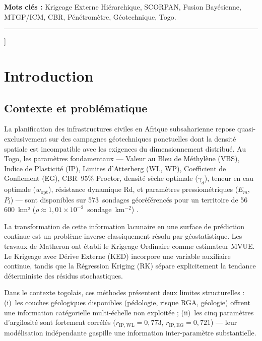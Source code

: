 \documentclass[10pt,a4paper,twocolumn]{article}
\begin{document}
  \smallskip
  \noindent\small
  \textbf{Mots clés :} Krigeage Externe Hiérarchique, SCORPAN, Fusion Bayésienne,
    MTGP/ICM, CBR, Pénétromètre, Géotechnique, Togo.

  \vspace{0.15cm}
  \rule{\linewidth}{0.4pt}
  \vspace{0.3cm}
]

\section{Introduction}

\subsection{Contexte et problématique}

La planification des infrastructures civiles en Afrique subsaharienne repose
quasi-exclusivement sur des campagnes géotechniques ponctuelles dont la densité
spatiale est incompatible avec les exigences du dimensionnement distribué.
Au Togo, les paramètres fondamentaux --- Valeur au Bleu de Méthylène (VBS),
Indice de Plasticité (IP), Limites d'Atterberg (WL, WP), Coefficient de Gonflement
(EG), CBR~95\% Proctor, densité sèche optimale ($\gamma_d$), teneur en eau
optimale ($w_{\mathrm{opt}}$), résistance dynamique Rd, et paramètres
pressiométriques ($E_m$, $P_l$) --- sont disponibles sur 573~sondages
géoréférencés pour un territoire de 56\,600~km²
($\rho \approx 1{,}01 \times 10^{-2}$~sondage~km$^{-2}$)
\cite{mcbratney2003digital}.

La transformation de cette information lacunaire en une surface de prédiction
continue est un problème inverse classiquement résolu par géostatistique.
Les travaux de Matheron \cite{matheron1963} ont établi le Krigeage Ordinaire
comme estimateur MVUE. Le Krigeage avec Dérive Externe (KED) \cite{odeh1994further}
incorpore une variable auxiliaire continue, tandis que la Régression Kriging (RK)
\cite{hengl2007regression} sépare explicitement la tendance déterministe
des résidus stochastiques.

Dans le contexte togolais, ces méthodes présentent deux limites structurelles :
(i)~les couches géologiques disponibles (pédologie, risque RGA, géologie)
offrent une information catégorielle multi-échelle non exploitée ;
(ii)~les cinq paramètres d'argilosité sont fortement corrélés
($r_{\mathrm{IP,WL}} = 0{,}773$, $r_{\mathrm{IP,EG}} = 0{,}721$) ---
leur modélisation indépendante gaspille une information inter-paramètre
substantielle.
\end{document}
